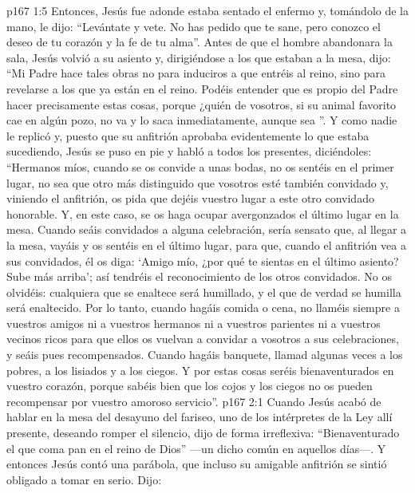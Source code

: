 \vs p167 1:5 \pc Entonces, Jesús fue adonde estaba sentado el enfermo y, tomándolo de la mano, le dijo: “Levántate y vete. No has pedido que te sane, pero conozco el deseo de tu corazón y la fe de tu alma”. Antes de que el hombre abandonara la sala, Jesús volvió a su asiento y, dirigiéndose a los que estaban a la mesa, dijo: “Mi Padre hace tales obras no para induciros a que entréis al reino, sino para revelarse a los que ya están en el reino. Podéis entender que es propio del Padre hacer precisamente estas cosas, porque ¿quién de vosotros, si su animal favorito cae en algún pozo, no va y lo saca inmediatamente, aunque sea ”. Y como nadie le replicó y, puesto que su anfitrión aprobaba evidentemente lo que estaba sucediendo, Jesús se puso en pie y habló a todos los presentes, diciéndoles: “Hermanos míos, cuando se os convide a unas bodas, no os sentéis en el primer lugar, no sea que otro más distinguido que vosotros esté también convidado y, viniendo el anfitrión, os pida que dejéis vuestro lugar a este otro convidado honorable. Y, en este caso, se os haga ocupar avergonzados el último lugar en la mesa. Cuando seáis convidados a alguna celebración, sería sensato que, al llegar a la mesa, vayáis y os sentéis en el último lugar, para que, cuando el anfitrión vea a sus convidados, él os diga: ‘Amigo mío, ¿por qué te sientas en el último asiento? Sube más arriba’; así tendréis el reconocimiento de los otros convidados. No os olvidéis: cualquiera que se enaltece será humillado, y el que de verdad se humilla será enaltecido. Por lo tanto, cuando hagáis comida o cena, no llaméis siempre a vuestros amigos ni a vuestros hermanos ni a vuestros parientes ni a vuestros vecinos ricos para que ellos os vuelvan a convidar a vosotros a sus celebraciones, y seáis pues recompensados. Cuando hagáis banquete, llamad algunas veces a los pobres, a los lisiados y a los ciegos. Y por estas cosas seréis bienaventurados en vuestro corazón, porque sabéis bien que los cojos y los ciegos no os pueden recompensar por vuestro amoroso servicio”.
\vs p167 2:1 Cuando Jesús acabó de hablar en la mesa del desayuno del fariseo, uno de los intérpretes de la Ley allí presente, deseando romper el silencio, dijo de forma irreflexiva: “Bienaventurado el que coma pan en el reino de Dios” ---un dicho común en aquellos días---. Y entonces Jesús contó una parábola, que incluso su amigable anfitrión se sintió obligado a tomar en serio. Dijo:
